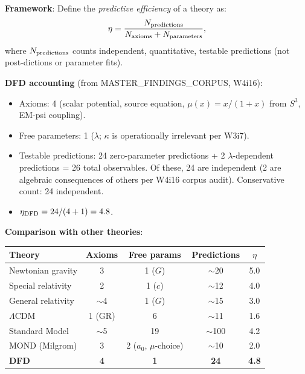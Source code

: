 \documentclass[11pt]{article}
\theoremstyle{definition}
\theoremstyle{remark}
\begin{document}
\begin{tcolorbox}[colback=blue!5!white, colframe=blue!60!black,
  title=\textbf{W4i17 TOP 5 FINDINGS --- READ FIRST}]
\begin{enumerate}[nosep]
  \textbf{Framework}: Define the \emph{predictive efficiency} of a
  theory as:
  \begin{equation}
    \eta = \frac{N_{\rm predictions}}{N_{\rm axioms} + N_{\rm parameters}},
  \end{equation}
  where $N_{\rm predictions}$ counts independent, quantitative, testable
  predictions (not post-dictions or parameter fits).

  \textbf{DFD accounting} (from MASTER\_FINDINGS\_CORPUS, W4i16):
  \begin{itemize}[nosep]
    \item Axioms: 4 (scalar potential, source equation, $\mu(x) = x/(1+x)$
      from $S^3$, EM-psi coupling).
    \item Free parameters: 1 ($\lambda$; $\kappa$ is operationally
      irrelevant per W3i7).
    \item Testable predictions: 24 zero-parameter predictions + 2
      $\lambda$-dependent predictions = 26 total observables. Of these,
      24 are independent (2 are algebraic consequences of others per
      W4i16 corpus audit). Conservative count: 24 independent.
    \item $\eta_{\rm DFD} = 24/(4 + 1) = 4.8$.
  \end{itemize}

  \textbf{Comparison with other theories}:
  \begin{center}
  \begin{tabular}{@{}lcccc@{}}
  \toprule
  Theory & Axioms & Free params & Predictions & $\eta$ \\
  \midrule
  Newtonian gravity & 3 & 1 ($G$) & $\sim$20 & 5.0 \\
  Special relativity & 2 & 1 ($c$) & $\sim$12 & 4.0 \\
  General relativity & $\sim$4 & 1 ($G$) & $\sim$15 & 3.0 \\
  $\Lambda$CDM & 1 (GR) & 6 & $\sim$11 & 1.6 \\
  Standard Model & $\sim$5 & 19 & $\sim$100 & 4.2 \\
  MOND (Milgrom) & 3 & 2 ($a_0$, $\mu$-choice) & $\sim$10 & 2.0 \\
  \textbf{DFD} & \textbf{4} & \textbf{1} & \textbf{24} & \textbf{4.8} \\
  \bottomrule
  \end{tabular}
  \end{center}


\end{enumerate}
\end{tcolorbox}
\end{document}
